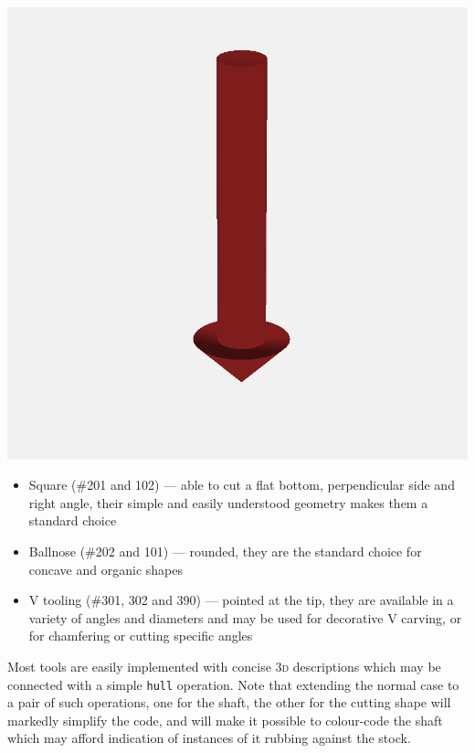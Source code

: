 \documentclass{ltxdoc}
\begin{document}
\begin{samepage}
           \includegraphics[width=\linewidth/3]{images/tool_V_301.png}%

\begin{itemize}
\item Square (\#201 and 102) --- able to cut a flat bottom, perpendicular side and
                                 right angle, their simple and easily understood 
                                 geometry makes them a standard choice 
\item Ballnose (\#202 and 101) --- rounded, they are the standard choice for concave
                                   and organic shapes
\item V tooling (\#301, 302 and 390) --- pointed at the tip, they are available in a
                                         variety of angles and diameters and may be
                                         used for decorative V carving, or for
                                         chamfering or cutting specific angles
\end{itemize}
\end{samepage}

Most tools are easily implemented with concise \textsc{3d} descriptions which may be connected with a simple \texttt{hull} operation. Note that extending the normal case to a pair of such operations, one for the shaft, the other for the cutting shape will markedly simplify the code, and will make it possible to colour-code the shaft which may afford indication of instances of it rubbing against the stock.
\end{document}
